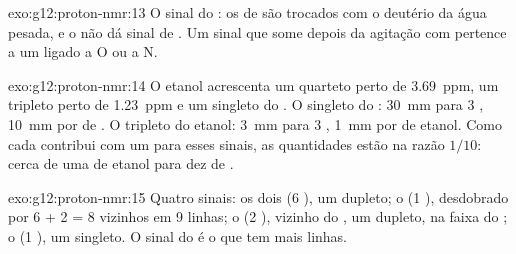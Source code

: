 \begin{solution}{exo:g12:proton-nmr:13}
O sinal do : os  de  são trocados com o deutério
da água pesada, e o  não dá sinal de . Um sinal que some
depois da agitação com  pertence a um  ligado a O ou a N.
\end{solution}

\begin{solution}{exo:g12:proton-nmr:14}
O etanol acrescenta um quarteto perto de \qty{3.69}{ppm}, um tripleto
perto de \qty{1.23}{ppm} e um singleto do . O singleto do :
\qty{30}{mm} para 3 , \qty{10}{mm} por  de . O
tripleto do etanol: \qty{3}{mm} para 3 , \qty{1}{mm} por 
de etanol. Como cada  contribui com um  para esses
sinais, as quantidades estão na razão $1/10$: cerca de uma  de
etanol para dez de .
\end{solution}

\begin{solution}{exo:g12:proton-nmr:15}
Quatro sinais: os dois  (6 ), um dupleto; o  (1
), desdobrado por 6 + 2 = 8 vizinhos em 9 linhas; o  (2
), vizinho do , um dupleto, na faixa do ; o
 (1 ), um singleto. O sinal do  é o que tem mais linhas.
\end{solution}

